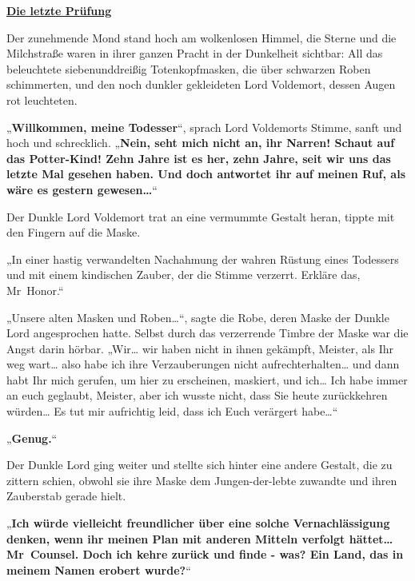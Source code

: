 

\hypertarget{die-letzte-pruxfcfung}{%

\textbf{\uline{Die letzte Prüfung}}

Der zunehmende Mond stand hoch am wolkenlosen Himmel, die Sterne und die Milchstraße waren in ihrer ganzen Pracht in der Dunkelheit sichtbar: All das beleuchtete siebenunddreißig Totenkopfmasken, die über schwarzen Roben schimmerten, und den noch dunkler gekleideten Lord Voldemort, dessen Augen rot leuchteten.

„\textbf{Willkommen, meine Todesser}“, sprach Lord Voldemorts Stimme, sanft und hoch und schrecklich. „\textbf{Nein, seht mich nicht an, ihr Narren! Schaut auf das Potter-Kind! Zehn Jahre ist es her, zehn Jahre, seit wir uns das letzte Mal gesehen haben. Und doch antwortet ihr auf meinen Ruf, als wäre es gestern gewesen…}“

Der Dunkle Lord Voldemort trat an eine vermummte Gestalt heran, tippte mit den Fingern auf die Maske.

„In einer hastig verwandelten Nachahmung der wahren Rüstung eines Todessers und mit einem kindischen Zauber, der die Stimme verzerrt. Erkläre das, Mr~Honor.“

„Unsere alten Masken und Roben…“, sagte die Robe, deren Maske der Dunkle Lord angesprochen hatte. Selbst durch das verzerrende Timbre der Maske war die Angst darin hörbar. „Wir… wir haben nicht in ihnen gekämpft, Meister, als Ihr weg wart… also habe ich ihre Verzauberungen nicht aufrechterhalten… und dann habt Ihr mich gerufen, um hier zu erscheinen, maskiert, und ich… Ich habe immer an euch geglaubt, Meister, aber ich wusste nicht, dass Sie heute zurückkehren würden… Es tut mir aufrichtig leid, dass ich Euch verärgert habe…“

„\textbf{Genug.}“

Der Dunkle Lord ging weiter und stellte sich hinter eine andere Gestalt, die zu zittern schien, obwohl sie ihre Maske dem Jungen-der-lebte zuwandte und ihren Zauberstab gerade hielt.

„\textbf{Ich würde vielleicht freundlicher über eine solche Vernachlässigung denken, wenn ihr meinen Plan mit anderen Mitteln verfolgt hättet… Mr~Counsel. Doch ich kehre zurück und finde - was? Ein Land, das in meinem Namen erobert wurde?}“

}
